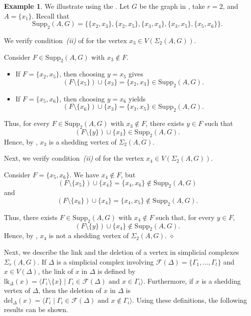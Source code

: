 \documentclass[12pt,reqno]{amsart}
\theoremstyle{definition}
\newtheorem{example}[proposition]{Example}
\newcommand{\lk}{{\mathrm{lk}}}
\newcommand{\del}{{\mathrm{del}}}
\newcommand{\Supp}{\mathrm{Supp}}
\def\F{\mathcal{F}}
\def\del{\mathrm{del}}
\def\l{\langle}
\def\r{\rangle}
\begin{document}
\medskip
\begin{example}
We illustrate  using the .  
Let $G$ be the graph in , take $r=2$, and
$A=\{x_1\}$. Recall that
\[
\Supp_2(A,G)
= \bigl\{
\{x_2,x_3\},\{x_2,x_5\},\{x_3,x_4\},\{x_3,x_5\},\{x_5,x_6\}
\bigr\}.
\]

\noindent
We verify condition~\emph{(ii)} of 
for the vertex $x_3 \in V(\Sigma_2(A,G))$.

\noindent
Consider $F \in \Supp_2(A,G)$ with $x_3 \notin F$.

\begin{itemize}
    \item If $F=\{x_2,x_5\}$, then choosing $y=x_5$ gives
    \[
    (F\setminus\{x_5\})\cup\{x_3\}
    =\{x_2,x_3\}\in \Supp_2(A,G).
    \]

    \item If $F=\{x_5,x_6\}$, then choosing $y=x_6$ yields
    \[
    (F\setminus\{x_6\})\cup\{x_3\}
    = \{x_3,x_5\} \in \Supp_2(A,G).
    \]
\end{itemize}

\noindent
Thus, for every $F\in \Supp_2(A,G)$ with $x_3\notin F$, there exists
$y\in F$ such that
\[
(F\setminus\{y\})\cup\{x_3\}\in \Supp_2(A,G).
\]
Hence, by ,
$x_3$ is a shedding vertex of\/ $\Sigma_2(A,G)$.

\medskip

Next, we verify condition~\emph{(ii)} of 
for the vertex $x_4 \in V(\Sigma_2(A,G))$.

\noindent
Consider $F=\{x_5,x_6\}$. We have $x_4\notin F$, but
\[
(F\setminus\{x_5\})\cup\{x_4\}
= \{x_4,x_6\}\notin \Supp_2(A,G)
\]
and
\[
(F\setminus\{x_6\})\cup\{x_4\}
= \{x_4,x_5\}\notin \Supp_2(A,G).
\]

\noindent
Thus, there exists $F\in \Supp_2(A,G)$ with $x_4\notin F$ such that, for every
$y\in F$,
\[
(F\setminus\{y\})\cup\{x_4\}\notin \Supp_2(A,G).
\]
Hence, by ,
$x_4$ is not a shedding vertex of\/ $\Sigma_2(A,G)$.
\hfill$\diamond$
\end{example}

\medskip
Next, we describe the link and the deletion of a vertex in simplicial complexes $\Sigma_r(A,G)$. 
If $\Delta$ is a simplicial complex involving $\F(\Delta)=\{\Gamma_1,\ldots,\Gamma_t\}$ and $x\in V(\Delta)$, the link of $x$ in $\Delta$ is defined by $\lk_{\Delta}(x)=\l \Gamma_i\setminus \{x\}\mid \Gamma_i\in \F(\Delta)\text{ and }x\in \Gamma_i\r$. 
Furthermore, if $x$ is a shedding vertex of $\Delta$, then the deletion of $x$ in $\Delta$ is $\del_{\Delta}(x)=\l \Gamma_i\mid \Gamma_i\in\F(\Delta) \text{ and } x\notin \Gamma_i\r$. 
Using these definitions, the following results can be shown.
    
\end{document}
